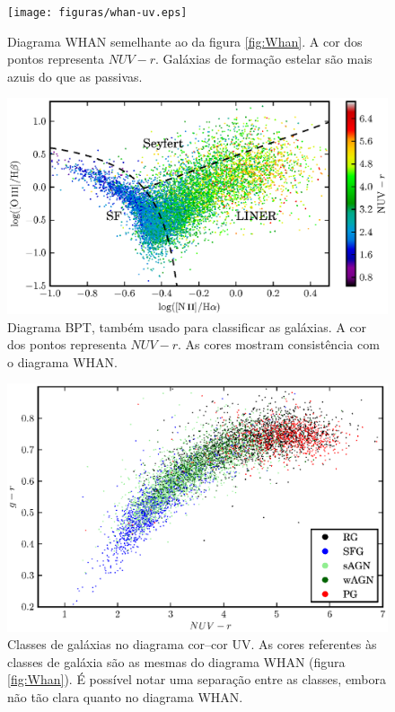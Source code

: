 \begin{figure}
	\texttt{[image: figuras/whan-uv.eps]}
	\caption[Cores ultravioleta no diagrama WHAN.]
	{Diagrama WHAN semelhante ao da figura \ref{fig:Whan}. A cor dos pontos
	representa $NUV-r$. Galáxias de formação estelar são mais azuis do que
	as passivas.}
	\label{fig:WhanUV}
\end{figure}

\begin{figure}
	\includegraphics{figuras/bpt-uv.eps}
	\caption[Cores ultravioleta no diagrama BPT.]
	{Diagrama BPT, também usado para classificar as galáxias. A cor dos
	pontos representa $NUV-r$. As cores mostram consistência com o diagrama WHAN.}
	\label{fig:BPTUV}
\end{figure}

\begin{figure}
	\includegraphics{figuras/uvcolor-color-class.eps}
	\caption[Diagrama cor--cor UV de acordo com o tipo de galáxia.]
	{Classes de galáxias no diagrama cor--cor UV. As cores referentes às classes de
	galáxia são as mesmas do diagrama WHAN (figura \ref{fig:Whan}). É possível
	notar uma separação entre as classes, embora não tão clara quanto no diagrama
	WHAN.}
	\label{fig:ColorClass}
\end{figure}

